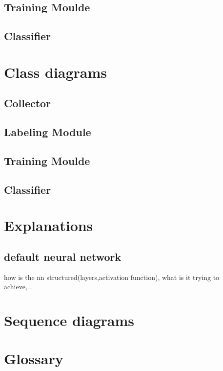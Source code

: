 \documentclass[parskip=full]{scrartcl}
\begin{document}
\subsection{Training Moulde}

\subsection{Classifier}


\section{Class diagrams}

\subsection{Collector}
\subsection{Labeling Module}
\subsection{Training Moulde}
\subsection{Classifier}


\section{Explanations}
\subsection{default neural network}
how is the nn structured(layers,activation function), what is it trying to achieve,...


\section{Sequence diagrams}

\section{Glossary}

%
\printnoidxglossaries
\end{document}
